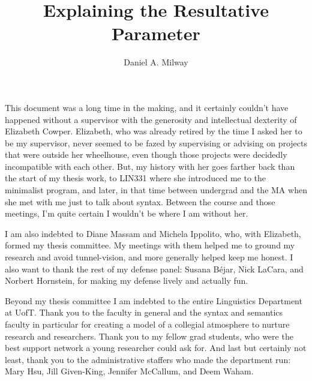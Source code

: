 \documentclass[
	12pt,
	twoside,
	narrowmargins
	]{ut-thesis}
\author{Daniel A. Milway}
\title{Explaining the Resultative Parameter}
\theoremstyle{definition}
\begin{document}
\begin{preliminary}
  \maketitle
  
  \begin{acknowledgements}
	  This document was a long time in the making, and it certainly couldn't have happened without a supervisor with the generosity and intellectual dexterity of Elizabeth Cowper.
	  Elizabeth, who was already retired by the time I asked her to be my supervisor, never seemed to be fazed by supervising or advising on projects that were outside her wheelhouse, even though those projects were decidedly incompatible with each other.
	  But, my history with her goes farther back than the start of my thesis work, to LIN331 where she introduced me to the minimalist program, and later, in that time between undergrad and the MA when she met with me just to talk about syntax.
	  Between the course and those meetings, I'm quite certain I wouldn't be where I am without her.

	  I am also indebted to Diane Massam and Michela Ippolito, who, with Elizabeth, formed my thesis committee. 
	  My meetings with them helped me to ground my research and avoid tunnel-vision, and more generally helped keep me honest.
	  I also want to thank the rest of my defense panel: Susana B\'{e}jar, Nick LaCara, and Norbert Hornstein, for making my defense lively and actually fun.

	  Beyond my thesis committee I am indebted to the entire Linguistics Department at UofT.
	  Thank you to the faculty in general and the syntax and semantics faculty in particular for creating a model of a collegial atmosphere to nurture research and researchers.
	  Thank you to my fellow grad students, who were the best support network a young researcher could ask for.
	  And last but certainly not least, thank you to the administrative staffers who made the department run: Mary Hsu, Jill Given-King, Jennifer McCallum, and Deem Waham.


\end{acknowledgements}
\end{preliminary}
\end{document}
